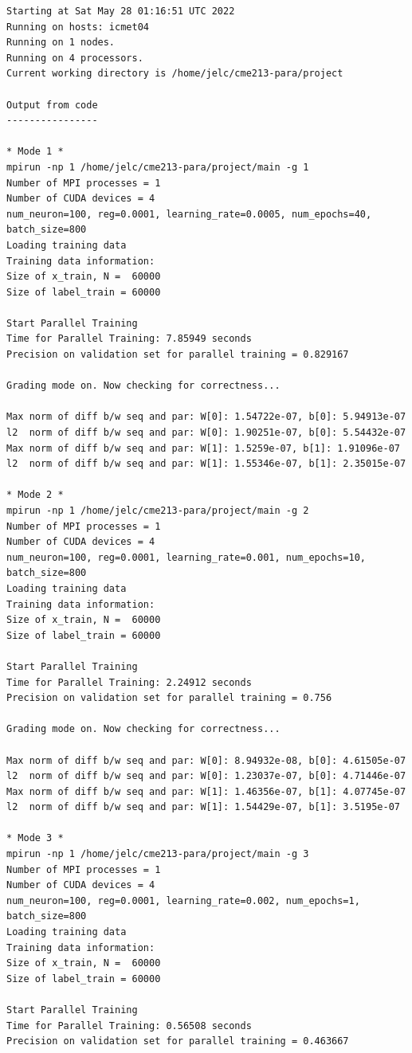\documentclass[12pt,letterpaper,twoside]{article}
\begin{document}
\begin{verbatim}
Starting at Sat May 28 01:16:51 UTC 2022
Running on hosts: icmet04
Running on 1 nodes.
Running on 4 processors.
Current working directory is /home/jelc/cme213-para/project

Output from code
----------------

* Mode 1 *
mpirun -np 1 /home/jelc/cme213-para/project/main -g 1
Number of MPI processes = 1
Number of CUDA devices = 4
num_neuron=100, reg=0.0001, learning_rate=0.0005, num_epochs=40, batch_size=800
Loading training data
Training data information:
Size of x_train, N =  60000
Size of label_train = 60000

Start Parallel Training
Time for Parallel Training: 7.85949 seconds
Precision on validation set for parallel training = 0.829167

Grading mode on. Now checking for correctness...

Max norm of diff b/w seq and par: W[0]: 1.54722e-07, b[0]: 5.94913e-07
l2  norm of diff b/w seq and par: W[0]: 1.90251e-07, b[0]: 5.54432e-07
Max norm of diff b/w seq and par: W[1]: 1.5259e-07, b[1]: 1.91096e-07
l2  norm of diff b/w seq and par: W[1]: 1.55346e-07, b[1]: 2.35015e-07

* Mode 2 *
mpirun -np 1 /home/jelc/cme213-para/project/main -g 2
Number of MPI processes = 1
Number of CUDA devices = 4
num_neuron=100, reg=0.0001, learning_rate=0.001, num_epochs=10, batch_size=800
Loading training data
Training data information:
Size of x_train, N =  60000
Size of label_train = 60000

Start Parallel Training
Time for Parallel Training: 2.24912 seconds
Precision on validation set for parallel training = 0.756

Grading mode on. Now checking for correctness...

Max norm of diff b/w seq and par: W[0]: 8.94932e-08, b[0]: 4.61505e-07
l2  norm of diff b/w seq and par: W[0]: 1.23037e-07, b[0]: 4.71446e-07
Max norm of diff b/w seq and par: W[1]: 1.46356e-07, b[1]: 4.07745e-07
l2  norm of diff b/w seq and par: W[1]: 1.54429e-07, b[1]: 3.5195e-07

* Mode 3 *
mpirun -np 1 /home/jelc/cme213-para/project/main -g 3
Number of MPI processes = 1
Number of CUDA devices = 4
num_neuron=100, reg=0.0001, learning_rate=0.002, num_epochs=1, batch_size=800
Loading training data
Training data information:
Size of x_train, N =  60000
Size of label_train = 60000

Start Parallel Training
Time for Parallel Training: 0.56508 seconds
Precision on validation set for parallel training = 0.463667


\end{verbatim}
\end{document}
